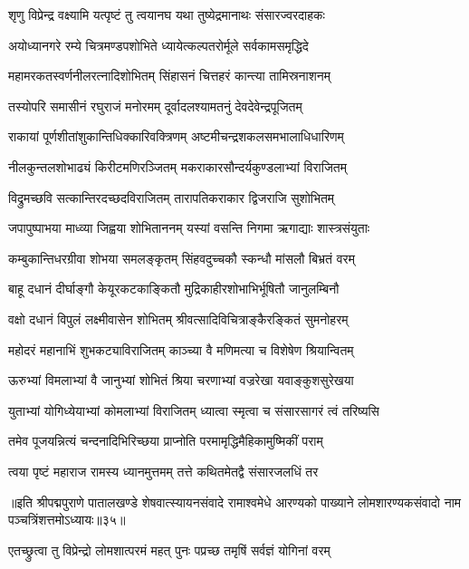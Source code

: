 \twolineshloka
{शृणु विप्रेन्द्र वक्ष्यामि यत्पृष्टं तु त्वयानघ}
{यथा तुष्येद्रमानाथः संसारज्वरदाहकः}%

\twolineshloka
{अयोध्यानगरे रम्ये चित्रमण्डपशोभिते}
{ध्यायेत्कल्पतरोर्मूले सर्वकामसमृद्धिदे}%

\twolineshloka
{महामरकतस्वर्णनीलरत्नादिशोभितम्}
{सिंहासनं चित्तहरं कान्त्या तामिस्रनाशनम्}%

\twolineshloka
{तस्योपरि समासीनं रघुराजं मनोरमम्}
{दूर्वादलश्यामतनुं देवदेवेन्द्रपूजितम्}%

\twolineshloka
{राकायां पूर्णशीतांशुकान्तिधिक्कारिवक्त्रिणम्}
{अष्टमीचन्द्रशकलसमभालाधिधारिणम्}%

\twolineshloka
{नीलकुन्तलशोभाढ्यं किरीटमणिरञ्जितम्}
{मकराकारसौन्दर्यकुण्डलाभ्यां विराजितम्}%

\twolineshloka
{विद्रुमच्छवि सत्कान्तिरदच्छदविराजितम्}
{तारापतिकराकार द्विजराजि सुशोभितम्}%

\twolineshloka
{जपापुष्पाभया माध्व्या जिह्वया शोभिताननम्}
{यस्यां वसन्ति निगमा ऋगाद्याः शास्त्रसंयुताः}%

\twolineshloka
{कम्बुकान्तिधरग्रीवा शोभया समलङ्कृतम्}
{सिंहवदुच्चकौ स्कन्धौ मांसलौ बिभ्रतं वरम्}%

\twolineshloka
{बाहू दधानं दीर्घाङ्गौ केयूरकटकाङ्कितौ}
{मुद्रिकाहीरशोभाभिर्भूषितौ जानुलम्बिनौ}%

\twolineshloka
{वक्षो दधानं विपुलं लक्ष्मीवासेन शोभितम्}
{श्रीवत्सादिविचित्राङ्कैरङ्कितं सुमनोहरम्}%

\twolineshloka
{महोदरं महानाभिं शुभकट्याविराजितम्}
{काञ्च्या वै मणिमत्या च विशेषेण श्रियान्वितम्}%

\twolineshloka
{ऊरुभ्यां विमलाभ्यां वै जानुभ्यां शोभितं श्रिया}
{चरणाभ्यां वज्ररेखा यवाङ्कुशसुरेखया}%

\twolineshloka
{युताभ्यां योगिध्येयाभ्यां कोमलाभ्यां विराजितम्}
{ध्यात्वा स्मृत्वा च संसारसागरं त्वं तरिष्यसि}%

\twolineshloka
{तमेव पूजयन्नित्यं चन्दनादिभिरिच्छया}
{प्राप्नोति परमामृद्धिमैहिकामुष्मिकीं पराम्}%

\twolineshloka
{त्वया पृष्टं महाराज रामस्य ध्यानमुत्तमम्}
{तत्ते कथितमेतद्वै संसारजलधिं तर}%

॥इति श्रीपद्मपुराणे पातालखण्डे शेषवात्स्यायनसंवादे रामाश्वमेधे आरण्यको पाख्याने लोमशारण्यकसंवादो नाम पञ्चत्रिंशत्तमोऽध्यायः॥३५॥



\twolineshloka
{एतच्छ्रुत्वा तु विप्रेन्द्रो लोमशात्परमं महत्}
{पुनः पप्रच्छ तमृषिं सर्वज्ञं योगिनां वरम्}%

